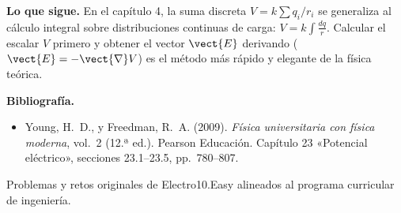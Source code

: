 \documentclass[11pt]{article}
\begin{document}
\begin{eConsejo}\textbf{Lo que sigue.} En el capítulo 4, la suma discreta $V=k\sum q_i/r_i$ se generaliza al cálculo integral sobre distribuciones continuas de carga: $V=k\int \frac{dq}{r}$. Calcular el escalar $V$ primero y obtener el vector $\vect{E}$ derivando ($\vect{E}=-\vect{\nabla}V$) es el método más rápido y elegante de la física teórica.\end{eConsejo}

{\small\textbf{Bibliografía.}
\begin{itemize}[leftmargin=*,itemsep=2pt,topsep=2pt]
  \item Young, H.~D., y Freedman, R.~A. (2009). \emph{Física universitaria con física moderna}, vol.~2 (12.ª ed.). Pearson Educación. Capítulo 23 «Potencial eléctrico», secciones 23.1--23.5, pp.~780--807.
\end{itemize}
{\color{e10muted}Problemas y retos originales de Electro10.Easy alineados al programa curricular de ingeniería.}}
\end{document}

